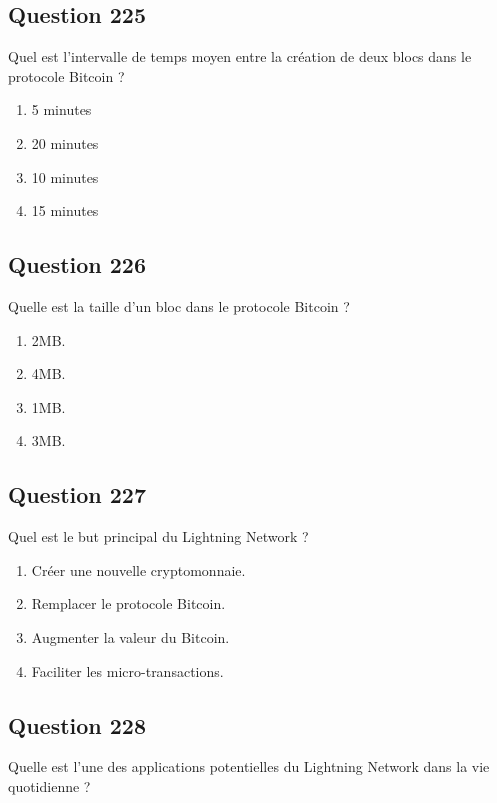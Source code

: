 \documentclass[12pt,a4paper]{article}
\begin{document}
\bigskip


\subsection*{Question 225}
Quel est l'intervalle de temps moyen entre la création de deux blocs dans le protocole Bitcoin ?

\begin{enumerate}[label=\Alph*., leftmargin=*]
\item 5 minutes
\item 20 minutes
\item 10 minutes
\item 15 minutes
\end{enumerate}

\bigskip


\subsection*{Question 226}
Quelle est la taille d'un bloc dans le protocole Bitcoin ?

\begin{enumerate}[label=\Alph*., leftmargin=*]
\item 2MB.
\item 4MB.
\item 1MB.
\item 3MB.
\end{enumerate}

\bigskip


\subsection*{Question 227}
Quel est le but principal du Lightning Network ?

\begin{enumerate}[label=\Alph*., leftmargin=*]
\item Créer une nouvelle cryptomonnaie.
\item Remplacer le protocole Bitcoin.
\item Augmenter la valeur du Bitcoin.
\item Faciliter les micro-transactions.
\end{enumerate}

\bigskip


\subsection*{Question 228}
Quelle est l'une des applications potentielles du Lightning Network dans la vie quotidienne ?
\end{document}
